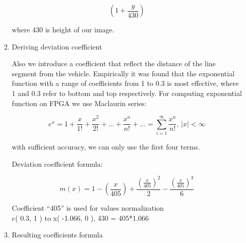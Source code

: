 \documentclass[a4paper,12pt]{article} %
\begin{document}
\begin{enumerate}
\begin{enumerate}
		\hspace{0.1cm}

		\begin{equation}
			\left (
			1 + \frac{y}{430}
			\right )
		\end{equation}

		\begin{flushright}
			\footnotesize where 430 is height of our image.
		\end{flushright}

		\newpage

		\item Deriving deviation coefficient
		
		Also we introduce a coefficient that reflect the distance of the line segment from the vehicle. Empirically it was found that the exponential function with a range of coefficients from 1 to 0.3 is most effective, where 1 and 0.3 refer to bottom and top respectively. For computing exponential function on FPGA we use Maclaurin series:


		\begin{equation}
			e^x = 1 + \frac{x}{1!} + \frac{x^2}{2!} + \ldots + \frac{x^n}{n!} + \ldots = \sum\limits_{i=1}^{\infty} \frac{x^n}{n!} \text{, } |x| < \infty
		\end{equation}
		

		with sufficient accuracy, we can only use the first four terms.
		
		Deviation coefficient formula:

		\begin{equation}
			m(x) = 1 - \left ( \frac{x}{405}\right) + 
			\frac{\left ( \frac{x}{405}\right) ^2}{2}  -
			\frac{\left ( \frac{x}{405}\right)^3}{6}
		\end{equation}

		\begin{flushright}
			\footnotesize Coefficient “405” is used for values normalization \\
			$e$( 0.3, 1 ) to x( -1.066, 0 ), 430 = 405*1.066
			
		\end{flushright}
		\vspace{1cm}
		
		\item Resulting coefficients formula
		

\end{enumerate}
\end{enumerate}
\end{document}
